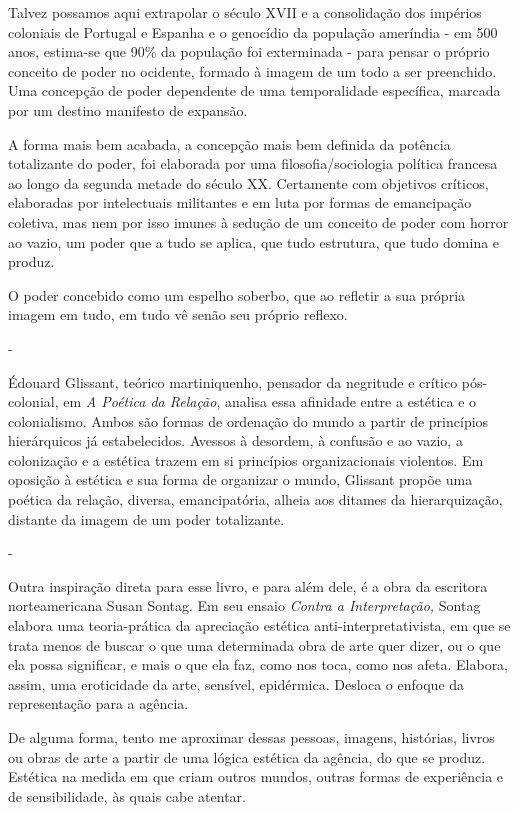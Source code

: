 Talvez possamos aqui extrapolar o século XVII e a consolidação dos
impérios coloniais de Portugal e Espanha e o genocídio da população
ameríndia - em 500 anos, estima-se que 90\% da população foi exterminada
- para pensar o próprio conceito de poder no ocidente, formado à imagem
de um todo a ser preenchido. Uma concepção de poder dependente de uma
temporalidade específica, marcada por um destino manifesto de expansão.

A forma mais bem acabada, a concepção mais bem definida da potência
totalizante do poder, foi elaborada por uma filosofia/sociologia
política francesa ao longo da segunda metade do século XX. Certamente
com objetivos críticos, elaboradas por intelectuais militantes e em luta
por formas de emancipação coletiva, mas nem por isso imunes à sedução de
um conceito de poder com horror ao vazio, um poder que a tudo se aplica,
que tudo estrutura, que tudo domina e produz.

O poder concebido como um espelho soberbo, que ao refletir a sua própria
imagem em tudo, em tudo vê senão seu próprio reflexo.

-

Édouard Glissant, teórico martiniquenho, pensador da negritude e crítico
pós-colonial, em \emph{A Poética da Relação}, analisa essa afinidade
entre a estética e o colonialismo. Ambos são formas de ordenação do
mundo a partir de princípios hierárquicos já estabelecidos. Avessos à
desordem, à confusão e ao vazio, a colonização e a estética trazem em si
princípios organizacionais violentos. Em oposição à estética e sua forma
de organizar o mundo, Glissant propõe uma poética da relação, diversa,
emancipatória, alheia aos ditames da hierarquização, distante da imagem
de um poder totalizante.

-

Outra inspiração direta para esse livro, e para além dele, é a obra da
escritora norteamericana Susan Sontag. Em seu ensaio \emph{Contra a
Interpretação,} Sontag elabora uma teoria-prática da apreciação estética
anti-interpretativista, em que se trata menos de buscar o que uma
determinada obra de arte quer dizer, ou o que ela possa significar, e
mais o que ela faz, como nos toca, como nos afeta. Elabora, assim, uma
eroticidade da arte, sensível, epidérmica. Desloca o enfoque da
representação para a agência.

De alguma forma, tento me aproximar dessas pessoas, imagens, histórias,
livros ou obras de arte a partir de uma lógica estética da agência, do
que se produz. Estética na medida em que criam outros mundos, outras
formas de experiência e de sensibilidade, às quais cabe atentar.

